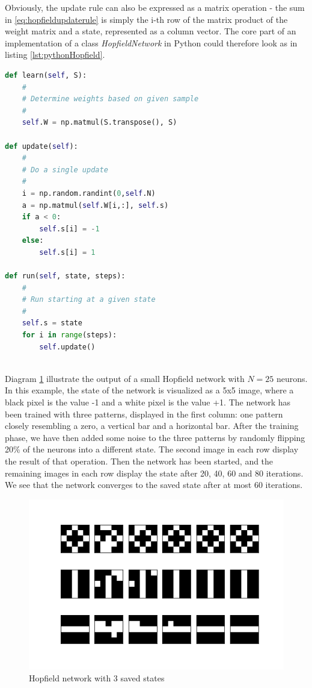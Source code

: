 \documentclass[a4paper, draft]{article}
\theoremstyle{own}
\theoremstyle{remark}
\begin{document}
Obviously, the update rule can also be expressed as a matrix operation - the sum in \eqref{eq:hopfieldupdaterule} is simply the i-th row of the matrix product of the weight matrix and a state, represented as a column vector. The core part of an implementation of a class {\it HopfieldNetwork} in Python could therefore look as in listing \ref{lst:pythonHopfield}.

\begin{lstlisting}[frame=single,language=Python,caption=Hopfield network in Python, float=ht,label=lst:pythonHopfield]
def learn(self, S):
    #
    # Determine weights based on given sample
    #
    self.W = np.matmul(S.transpose(), S)
    
def update(self):
    #
    # Do a single update
    #
    i = np.random.randint(0,self.N)
    a = np.matmul(self.W[i,:], self.s)
    if a < 0:
        self.s[i] = -1
    else:
        self.s[i] = 1
    
def run(self, state, steps):
    # 
    # Run starting at a given state
    # 
    self.s = state
    for i in range(steps):
        self.update()
    
\end{lstlisting}

Diagram \ref{fig:HopfieldOne} illustrate the output of a small Hopfield network with $N=25$ neurons. In this example, the state of the network is visualized as a 5x5 image, where a black pixel is the value -1 and a white pixel is the value +1. The network has been trained with three patterns, displayed in the first column: one pattern closely resembling a zero, a vertical bar and a horizontal bar. After the training phase, we have then added some noise to the three patterns by randomly flipping 20\% of the neurons into a different state. The second image in each row display the result of that operation. Then the network has been started, and the remaining images in each row display the state after 20, 40, 60 and 80 iterations. We see that the network converges to the saved state after at most 60 iterations. 

\begin{figure}[ht]
\centering
\includegraphics[width=0.7\linewidth]{HopfieldOne}
\caption{Hopfield network with 3 saved states}
\label{fig:HopfieldOne}
\end{figure}
\end{document}
